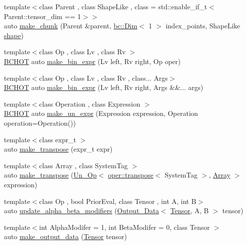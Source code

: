 \begin{DoxyCompactItemize}
\item 
{\footnotesize template$<$class Parent , class Shape\+Like , class  = std\+::enable\+\_\+if\+\_\+t$<$\+Parent\+::tensor\+\_\+dim == 1$>$$>$ }\\auto \hyperlink{namespacebc_1_1tensors_1_1exprs_a08fc131daf9ebc11798cec3668ebfca8}{make\+\_\+chunk} (Parent \&parent, \hyperlink{structbc_1_1Dim}{bc\+::\+Dim}$<$ 1 $>$ index\+\_\+points, Shape\+Like \hyperlink{namespacebc_a1bc6dec532973ac024c738c0fd32cca3}{shape})
\item 
{\footnotesize template$<$class Op , class Lv , class Rv $>$ }\\\hyperlink{common_8h_ac085f07cc309e3aac24aa3fc0a40f6d2}{B\+C\+H\+OT} auto \hyperlink{namespacebc_1_1tensors_1_1exprs_ab117a0b2ba90c87666962cbfd53db54b}{make\+\_\+bin\+\_\+expr} (Lv left, Rv right, Op oper)
\item 
{\footnotesize template$<$class Op , class Lv , class Rv , class... Args$>$ }\\\hyperlink{common_8h_ac085f07cc309e3aac24aa3fc0a40f6d2}{B\+C\+H\+OT} auto \hyperlink{namespacebc_1_1tensors_1_1exprs_a364989ca47000094471fc531fcec0a2f}{make\+\_\+bin\+\_\+expr} (Lv left, Rv right, Args \&\&... args)
\item 
{\footnotesize template$<$class Operation , class Expression $>$ }\\\hyperlink{common_8h_ac085f07cc309e3aac24aa3fc0a40f6d2}{B\+C\+H\+OT} auto \hyperlink{namespacebc_1_1tensors_1_1exprs_afcded75875b3598bafaffb7ad18d3173}{make\+\_\+un\+\_\+expr} (Expression expression, Operation operation=Operation())
\item 
{\footnotesize template$<$class expr\+\_\+t $>$ }\\auto \hyperlink{namespacebc_1_1tensors_1_1exprs_ae190e4e61e8d5caaaa750e65942d9052}{make\+\_\+transpose} (expr\+\_\+t expr)
\item 
{\footnotesize template$<$class Array , class System\+Tag $>$ }\\auto \hyperlink{namespacebc_1_1tensors_1_1exprs_af7cf5f21ea51f436ae32955208884505}{make\+\_\+transpose} (\hyperlink{structbc_1_1tensors_1_1exprs_1_1Un__Op}{Un\+\_\+\+Op}$<$ \hyperlink{structbc_1_1oper_1_1transpose}{oper\+::transpose}$<$ System\+Tag $>$, \hyperlink{structbc_1_1tensors_1_1exprs_1_1Array}{Array} $>$ expression)
\item 
{\footnotesize template$<$class Op , bool Prior\+Eval, class Tensor , int A, int B$>$ }\\auto \hyperlink{namespacebc_1_1tensors_1_1exprs_a1c3a1ebea52ac80a7f1fbe90856d3132}{update\+\_\+alpha\+\_\+beta\+\_\+modifiers} (\hyperlink{structbc_1_1tensors_1_1exprs_1_1Output__Data}{Output\+\_\+\+Data}$<$ \hyperlink{namespacebc_a659391e47ab612be3ba6c18cf9c89159}{Tensor}, A, B $>$ tensor)
\item 
{\footnotesize template$<$int Alpha\+Modifer = 1, int Beta\+Modifer = 0, class Tensor $>$ }\\auto \hyperlink{namespacebc_1_1tensors_1_1exprs_a8ea5debb37c94a5cc429bd9384fade81}{make\+\_\+output\+\_\+data} (\hyperlink{namespacebc_a659391e47ab612be3ba6c18cf9c89159}{Tensor} tensor)
\end{DoxyCompactItemize}


